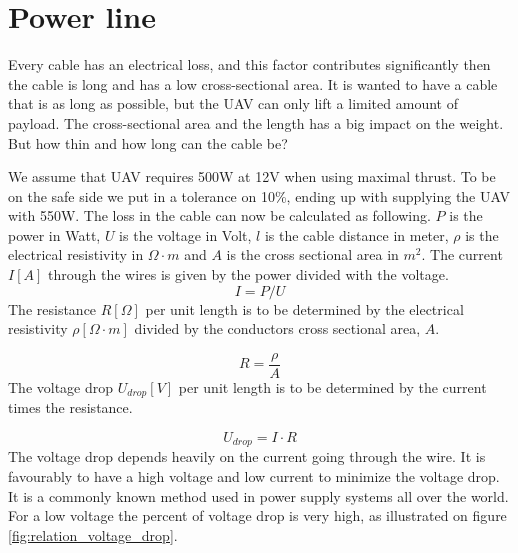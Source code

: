 \section{Power line}

Every cable has an electrical loss, and this factor contributes significantly then the cable is long and has a low cross-sectional area. It is wanted to have a cable that is as long as possible, but the UAV can only lift a limited amount of payload. The cross-sectional area and the length has a big impact on the weight. But how thin and how long can the cable be?
 
\noindent
We assume that UAV requires 500W at 12V when using maximal thrust. To be on the safe side we put in a tolerance on 10\%, ending up with supplying the UAV with 550W. 
The loss in the cable can now be calculated as following. 
$P$ is the power in Watt, $U$ is the voltage in Volt, $l$ is the cable distance in meter, $\rho$ is the electrical resistivity in $\Omega \cdot m$ and $A$ is the cross sectional area in $m^2$.
\noindent
The current $I[A]$ through the wires is given by the power divided with the voltage.
\begin{equation}
I = P/U
\end{equation}
\noindent
The resistance $R[\Omega]$ per unit length is to be determined by the electrical resistivity $\rho [\Omega \cdot m]$ divided by the conductors cross sectional area, $A$.

\begin{equation}
R = \frac{\rho}{A}
\end{equation}
\noindent
The voltage drop $U_{drop}[V]$ per unit length is to be determined by  the current times the resistance.

\begin{equation}
U_{drop} = I \cdot R
\end{equation}
\noindent
The voltage drop depends heavily on the current going through the wire. It is favourably to have a high voltage and low current to minimize the voltage drop. It is a commonly known method used in power supply systems all over the world. For a low voltage the percent of voltage drop is very high, as illustrated on figure \ref{fig:relation_voltage_drop}.

